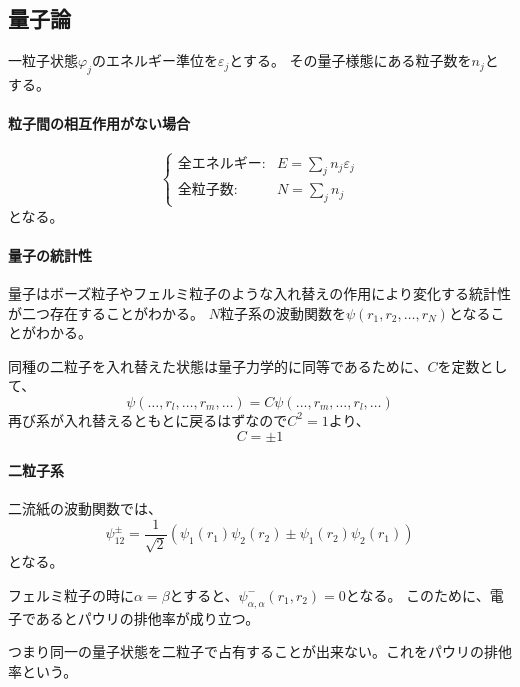 \documentclass[titlepage]{ltjsarticle}
\begin{document}
\subsection{量子論}
一粒子状態\(\varphi_j\)のエネルギー準位を\(\varepsilon_j\)とする。
その量子様態にある粒子数を\(n_j\)とする。

\paragraph{粒子間の相互作用がない場合}

\begin{equation}\label{eq:1.1}
  \begin{cases}
    \text{全エネルギー} : & E = \sum_j n_j \varepsilon_j \\
    \text{全粒子数} : & N = \sum_j n_j
  \end{cases}
\end{equation}
となる。

\paragraph{量子の統計性}
量子はボーズ粒子やフェルミ粒子のような入れ替えの作用により変化する統計性が二つ存在することがわかる。
\(N\)粒子系の波動関数を\(\psi(r_1,r_2,\ldots ,r_N)\)となることがわかる。

同種の二粒子を入れ替えた状態は量子力学的に同等であるために、\(C\)を定数として、
\begin{equation}
  \psi(\dots,r_l,\dots,r_m,\dots) =C \psi(\dots,r_m,\dots,r_l,\dots)
\end{equation}
再び系が入れ替えるともとに戻るはずなので\(C^2=1\)より、
\begin{equation}
  C=  \pm 1 
\end{equation}


\paragraph{二粒子系}
二流紙の波動関数では、
\begin{equation}
  \psi^{\pm}_{12} = \frac{1}{\sqrt{2}}\left( \psi_1(r_1)\psi_2(r_2) \pm \psi_1(r_2)\psi_2(r_1) \right)
\end{equation}
となる。

フェルミ粒子の時に\(\alpha=\beta\)とすると、\(\psi^{-}_{\alpha,\alpha}(r_1,r_2)=0\)となる。
このために、電子であるとパウリの排他率が成り立つ。

つまり同一の量子状態を二粒子で占有することが出来ない。これをパウリの排他率という。
\end{document}
